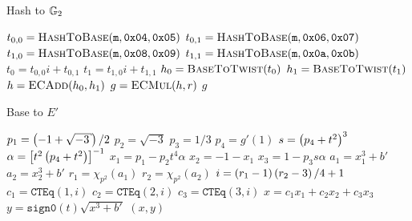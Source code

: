 \begin{algorithm}[tp]
\caption{Hash to $\mathbb{G}_{2}$}
\label{alg:hash-to-G2}
\begin{algorithmic}[1]
    \State $t_{0,0}=\textsc{HashToBase}(\texttt{m},\texttt{0x04},\texttt{0x05})$
    \State $t_{0,1}=\textsc{HashToBase}(\texttt{m},\texttt{0x06},\texttt{0x07})$
    \State $t_{1,0}=\textsc{HashToBase}(\texttt{m},\texttt{0x08},\texttt{0x09})$
    \State $t_{1,1}=\textsc{HashToBase}(\texttt{m},\texttt{0x0a},\texttt{0x0b})$
    \State $t_{0} = t_{0,0}i + t_{0,1}$
    \State $t_{1} = t_{1,0}i + t_{1,1}$
    \State $h_{0} = \textsc{BaseToTwist}(t_{0})$
    \State $h_{1} = \textsc{BaseToTwist}(t_{1})$
    \State $h = \textsc{ECAdd}(h_{0},h_{1})$
    \State $g = \textsc{ECMul}(h, r)$
    \State \Return $g$
\EndFunction
\end{algorithmic}
\end{algorithm}

\begin{algorithm}[tp]
\caption{Base to $E'$}
\label{alg:base-to-twist}
\begin{algorithmic}[1]
    \State $p_{1} = \parens{-1+\sqrt{-3}}/2$
    \State $p_{2} = \sqrt{-3}$
    \State $p_{3} = 1/3$
    \State $p_{4} = g'(1)$
    \State $s = \left( p_{4} + t^{2} \right)^{3}$
    \State $\alpha = \left[ t^{2}\left( p_{4} + t^{2} \right) \right]^{-1}$
    \State $x_{1} = p_{1} - p_{2}t^{4}\alpha$
    \State $x_{2} = -1 - x_{1}$
    \State $x_{3} = 1 - p_{3}s\alpha$
    \State $a_{1} = x_{1}^{3} + b'$
    \State $a_{2} = x_{2}^{3} + b'$
    \State $r_{1} = \chi_{p^{2}}(a_{1})$
    \State $r_{2} = \chi_{p^{2}}(a_{2})$
    \State $i = \left( r_{1}-1 \right)\left( r_{2}-3 \right)/4 + 1$
    \State $c_{1} = \texttt{CTEq}(1,i)$
    \State $c_{2} = \texttt{CTEq}(2,i)$
    \State $c_{3} = \texttt{CTEq}(3,i)$
    \State $x = c_{1}x_{1} + c_{2}x_{2} + c_{3}x_{3}$
    \State $y = \texttt{sign0}(t)\sqrt{x^{3}+b'}$
    \State \Return $(x, y)$
\EndFunction
\end{algorithmic}
\end{algorithm}
